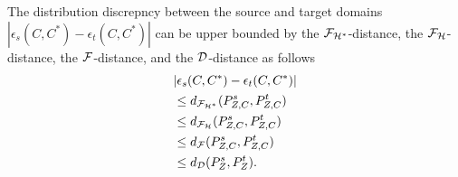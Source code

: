 \documentclass[letterpaper]{article} \usepackage{aaai20}  \usepackage{times}  \usepackage{helvet} \usepackage{courier}  \usepackage[hyphens]{url}  \usepackage{graphicx} \urlstyle{rm} \def\UrlFont{\rm}  \usepackage{graphicx}  \frenchspacing  \setlength{\pdfpagewidth}{8.5in}  \setlength{\pdfpageheight}{11in}
\begin{document}
\begin{theorem}
	\label{tighterBound}
	The distribution discrepncy between the source and target domains $|\epsilon_s(C, C^*) - \epsilon_t(C, C^*)|$ can be upper bounded by the ${\cal{F}}_{{\cal{H}}^*}$-distance, the ${\cal{F}}_{\cal{H}}$-distance, the $\cal{F}$-distance, and the $\cal{D}$-distance as follows 
	\begin{eqnarray}\label{EqnExpDistDiscBound5}
	\begin{aligned}
	&|\epsilon_s(C, C^*) - \epsilon_t(C, C^*)| \\
	&\le d_{{\cal{F}}_{{\cal{H}}^*}} (P_{Z, C}^s, P_{Z, C}^t) \\
	&\le d_{{\cal{F}}_{\cal{H}}} (P_{Z, C}^s, P_{Z, C}^t) \\
	&\le d_{\cal{F}} (P_{Z, C}^s, P_{Z, C}^t) \\
	&\le d_{\cal{D}} (P_{Z}^s, P_{Z}^t). 
	\end{aligned}
	\end{eqnarray}
\end{theorem}
\end{document}
